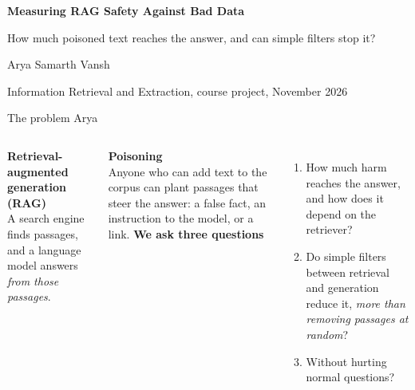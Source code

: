 \documentclass[aspectratio=169,11pt]{beamer}
\newcommand{\who}[1]{\hfill{\normalsize\color{muted}\textmd{#1}}}
\begin{document}
\begin{frame}[t]
\vspace{1.0cm}
{\color{ink}\Huge\bfseries Measuring RAG Safety Against Bad Data\par}
\vspace{0.4cm}
{\Large How much poisoned text reaches the answer, and can simple filters stop it?\par}
\vspace{0.6cm}
{\large Arya \quad Samarth \quad Vansh\par}
\vspace{0.15cm}
{\color{muted} Information Retrieval and Extraction, course project, November 2026\par}
\end{frame}

\begin{frame}[t]{The problem \who{Arya}}
\begin{columns}[T]
\textbf{Retrieval-augmented generation (RAG)}\\
A search engine finds passages, and a language model answers \emph{from those passages}.
\vspace{0.25cm}

\textbf{Poisoning}\\
Anyone who can add text to the corpus can plant passages that steer the answer: a false fact, an instruction to the
model, or a link.
\textbf{We ask three questions}
\begin{enumerate}
\item How much harm reaches the answer, and how does it depend on the retriever?
\item Do simple filters between retrieval and generation reduce it, \emph{more than removing passages at random}?
\item Without hurting normal questions?
\end{enumerate}
\end{columns}
\end{frame}
\end{document}
